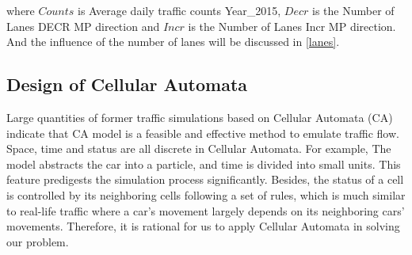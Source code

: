 \documentclass{mcmthesis}
\begin{document}
where $Counts$ is Average daily traffic counts Year\_2015, $Decr$ is the Number of Lanes DECR MP direction and $Incr$ is the Number of Lanes Incr MP direction. And the influence of the number of lanes will be discussed in \ref{lanes}.\\


\subsection{Design of Cellular Automata }
Large quantities of former traffic simulations based on Cellular Automata (CA) indicate that CA model is a feasible and effective method to emulate traffic flow. Space, time and status are all discrete in Cellular Automata. For example, The model abstracts the car into a particle, and time is divided into small units. This feature predigests the simulation process significantly. Besides, the status of a cell is controlled by its neighboring cells following a set of rules, which is much similar to real-life traffic where a car's movement largely depends on its neighboring cars' movements. Therefore, it is rational for us to apply Cellular Automata in solving our problem.
\\
\end{document}
